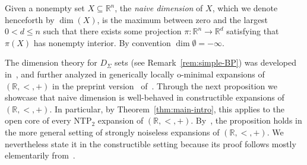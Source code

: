 \documentclass[12pt]{article}
\newcommand{\R}{\mathbb{R}}
\newcommand{\NTP}{\ensuremath{\mathrm{NTP}_2}}
\theoremstyle{definition}
\theoremstyle{remark}
\begin{document}

Given a nonempty set $X\subseteq \R^n$, the \emph{naive dimension} of $X$, which we denote henceforth by $\dim(X)$, is the maximum between zero and the largest $0< d \leq n$ such that there exists some projection $\pi:\R^n \rightarrow \R^d$ satisfying that $\pi(X)$ has nonempty interior. By convention $\dim \emptyset = -\infty$.  

The dimension theory for $D_\Sigma$ sets (see Remark~\ref{rem:simple-BP}) was developed in~\cite{comp-set}, and further analyzed in generically locally o-minimal expansions of $(\R,<,+)$ in the preprint version~\cite{wal22-preprint} of~\cite{Wal22}. Through the next proposition we showcase that naive dimension is well-behaved in constructible expansions of $(\R,<,+)$. In particular, by Theorem~\ref{thm:main-intro}, this applies to the open core of every $\NTP$ expansion of $(\R,<,+)$. By~\cite[Section 10]{wal22-preprint}, the proposition holds in the more general setting of strongly noiseless expansions of $(\R,<,+)$. We nevertheless state it in the constructible setting because its proof follows mostly elementarily from~\cite{comp-set}.
\end{document}
